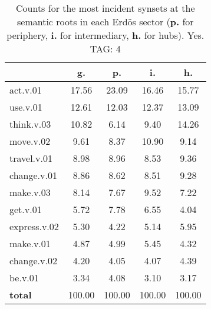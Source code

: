 \begin{table}[h!]
\begin{center}
\begin{tabular}{| l | c | c | c | c |}\hline
 & g. & p. & i. & h. \\\hline
act.v.01 & 17.56  & 23.09  & 16.46  & 15.77 \\\hline
use.v.01 & 12.61  & 12.03  & 12.37  & 13.09 \\\hline
think.v.03 & 10.82  & 6.14  & 9.40  & 14.26 \\\hline
move.v.02 & 9.61  & 8.37  & 10.90  & 9.14 \\\hline
travel.v.01 & 8.98  & 8.96  & 8.53  & 9.36 \\\hline
change.v.01 & 8.86  & 8.62  & 8.51  & 9.28 \\\hline
make.v.03 & 8.14  & 7.67  & 9.52  & 7.22 \\\hline
get.v.01 & 5.72  & 7.78  & 6.55  & 4.04 \\\hline
express.v.02 & 5.30  & 4.22  & 5.14  & 5.95 \\\hline
make.v.01 & 4.87  & 4.99  & 5.45  & 4.32 \\\hline
change.v.02 & 4.20  & 4.05  & 4.07  & 4.39 \\\hline
be.v.01 & 3.34  & 4.08  & 3.10  & 3.17 \\\hline
{{\bf total}} & 100.00  & 100.00  & 100.00  & 100.00 \\\hline
\end{tabular}
\caption{Counts for the most incident synsets at the semantic roots in each Erd\"os sector ({\bf p.} for periphery, {\bf i.} for intermediary, {\bf h.} for hubs). Yes. TAG: 4}
\end{center}
\end{table}